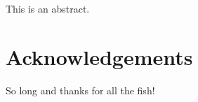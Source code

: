 \documentclass[10pt,leftblank,twoside]{mitthesis}
\begin{document}


\cleardoublepage
\setcounter{savepage}{\thepage}
\begin{abstractpage}

This is an abstract.

\end{abstractpage}

\cleardoublepage

\section*{Acknowledgements}

So long and thanks for all the fish!

\pagestyle{plain}

\tableofcontents
\newpage
\listoffigures
\newpage
\renewcommand\listoflistingscaption{List of source codes}
\listoflistings
\newpage
\listoftables
\end{document}
